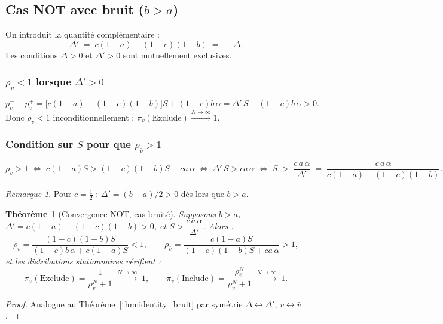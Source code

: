 \documentclass[12pt,a4paper]{article}
\newtheorem{theorem}{Théorème}[section]
\theoremstyle{remark}
\newtheorem{remark}{Remarque}[section]
\newcommand{\Inc}{\ensuremath{\mathrm{Include}}}
\newcommand{\Exc}{\ensuremath{\mathrm{Exclude}}}
\newcommand{\vbar}{\bar{v}}
\begin{document}
\subsection{Cas NOT avec bruit ($b > a$)}

On introduit la quantité complémentaire :
\[
  \Delta' \;=\; c(1-a) - (1-c)(1-b) \;=\; -\Delta.
\]
Les conditions $\Delta > 0$ et $\Delta' > 0$ sont mutuellement exclusives.

\subsubsection*{$\rho_v < 1$ lorsque $\Delta' > 0$}

\[
  p^-_v - p^+_v
  = \bigl[c(1-a) - (1-c)(1-b)\bigr]S + (1-c)b\,\alpha
  = \Delta'\,S + (1-c)b\,\alpha > 0.
\]
Donc $\rho_v < 1$ inconditionnellement : $\pi_v(\Exc) \xrightarrow{N\to\infty} 1$.

\subsubsection*{Condition sur $S$ pour que $\rho_{\vbar} > 1$}

\[
  \rho_{\vbar} > 1
  \;\Longleftrightarrow\;
  c(1-a)S > (1-c)(1-b)S + ca\,\alpha
  \;\Longleftrightarrow\;
  \Delta'\,S > ca\,\alpha
  \;\Longleftrightarrow\;
  \boxed{S \;>\; \frac{c\,a\,\alpha}{\Delta'}
         \;=\; \frac{c\,a\,\alpha}{c(1-a)-(1-c)(1-b)}.}
\]

\begin{remark}
Pour $c = \tfrac{1}{2}$ : $\Delta' = (b-a)/2 > 0$ dès lors que $b > a$.
\end{remark}

\begin{theorem}[Convergence NOT, cas bruité]\label{thm:not_bruit}
Supposons $b > a$, $\Delta' = c(1-a)-(1-c)(1-b) > 0$, et
$S > \dfrac{c\,a\,\alpha}{\Delta'}$.  Alors :
\[
  \rho_v = \frac{(1-c)(1-b)S}{(1-c)b\,\alpha+c(1-a)S} < 1,
  \qquad
  \rho_{\vbar} = \frac{c(1-a)S}{(1-c)(1-b)S+ca\,\alpha} > 1,
\]
et les distributions stationnaires vérifient :
\[
  \pi_v(\Exc) = \frac{1}{\rho_v^N+1} \;\xrightarrow{N\to\infty}\; 1,
  \qquad
  \pi_{\vbar}(\Inc) = \frac{\rho_{\vbar}^N}{\rho_{\vbar}^N+1} \;\xrightarrow{N\to\infty}\; 1.
\]
\end{theorem}

\begin{proof}
Analogue au Théorème~\ref{thm:identity_bruit} par symétrie $\Delta \leftrightarrow \Delta'$,
$v \leftrightarrow \vbar$.
\end{proof}
\end{document}

